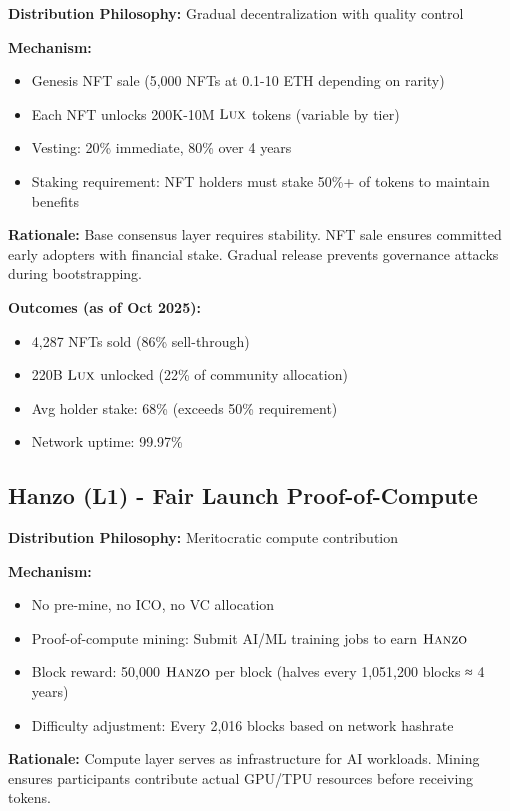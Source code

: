 \documentclass[11pt,letterpaper]{article}
\theoremstyle{definition}
\theoremstyle{remark}
\newcommand{\Hanzo}{\textsc{Hanzo}}
\newcommand{\Lux}{\textsc{Lux}}
\begin{document}
\textbf{Distribution Philosophy:} Gradual decentralization with quality control

\textbf{Mechanism:}
\begin{itemize}
\item Genesis NFT sale (5,000 NFTs at 0.1-10 ETH depending on rarity)
\item Each NFT unlocks 200K-10M $\Lux$ tokens (variable by tier)
\item Vesting: 20\% immediate, 80\% over 4 years
\item Staking requirement: NFT holders must stake 50\%+ of tokens to maintain benefits
\end{itemize}

\textbf{Rationale:} Base consensus layer requires stability. NFT sale ensures committed early adopters with financial stake. Gradual release prevents governance attacks during bootstrapping.

\textbf{Outcomes (as of Oct 2025):}
\begin{itemize}
\item 4,287 NFTs sold (86\% sell-through)
\item 220B $\Lux$ unlocked (22\% of community allocation)
\item Avg holder stake: 68\% (exceeds 50\% requirement)
\item Network uptime: 99.97\%
\end{itemize}

\subsection{Hanzo (L1) - Fair Launch Proof-of-Compute}

\textbf{Distribution Philosophy:} Meritocratic compute contribution

\textbf{Mechanism:}
\begin{itemize}
\item No pre-mine, no ICO, no VC allocation
\item Proof-of-compute mining: Submit AI/ML training jobs to earn $\Hanzo$
\item Block reward: 50,000 $\Hanzo$ per block (halves every 1,051,200 blocks ≈ 4 years)
\item Difficulty adjustment: Every 2,016 blocks based on network hashrate
\end{itemize}

\textbf{Rationale:} Compute layer serves as infrastructure for AI workloads. Mining ensures participants contribute actual GPU/TPU resources before receiving tokens.
\end{document}
